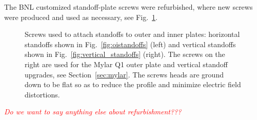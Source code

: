 The BNL customized standoff-plate screws were refurbished, where new screws were produced and used as necessary, see Fig.~\ref{fig:plate_screws}.
\begin{figure}[]
	\centering
	\caption{Screws used to attach standoffs to outer and inner plates: horizontal standoffs shown in Fig.~\ref{fig:oistandoffs} (left) and vertical standoffs shown in Fig.~\ref{fig:vertical_standoffs} (right). The screws on the right are used for the Mylar Q1 outer plate and vertical standoff upgrades, see Section~\ref{sec:mylar}. The screws heads are ground down to be flat so as to reduce the profile and minimize electric field distortions.}\label{fig:plate_screws}
\end{figure}

\medskip
\textcolor{red}{\textit{Do we want to say anything else about refurbishment???}}


